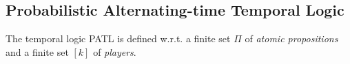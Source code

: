 \documentclass[times, 10 pt,twocolumn]{article}
\newtheorem{definition}[theorem]{Definition}{\bfseries}{\rm}
\newcommand{\mb}[1]{\mathbb{#1}}
\newcommand{\mc}[1]{\mathcal{#1}}
\begin{document}

%
%
%

%
%

\subsection{Probabilistic Alternating-time Temporal Logic}
The temporal logic PATL is defined w.r.t. a finite set $\Pi$ of
\emph{atomic propositions} and a finite set $[k]$ of
\emph{players}.
\end{document}
